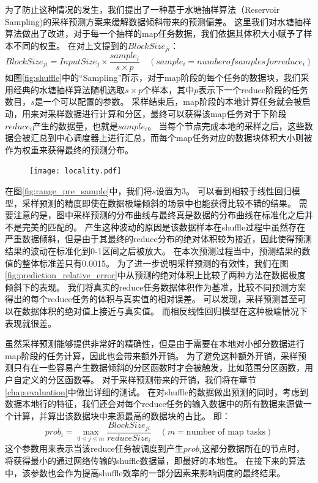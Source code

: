 为了防止这种情况的发生，我们提出了一种基于水塘抽样算法（Reservoir Sampling)\cite{reservoir}的采样预测方案来缓解数据倾斜带来的预测偏差。
这里我们对水塘抽样算法做出了改进，对于每一个抽样的map任务数据，我们依据其体积大小赋予了样本不同的权重。
在对上文提到的$BlockSize_{ji}$：
\begin{equation}
	\label{eq:sample}
	BlockSize_{ji} = {{InputSize_j \times \frac{sample_i}{s \times p}}} \quad (sample_i = number of samples for reduce_i)
\end{equation}
如图\ref{fig:shuffle}中的“Sampling”所示，对于map阶段的每个任务的数据块，我们采用经典的水塘抽样算法随机选取$s \times p$个样本，其中$p$表示下一个reduce阶段的任务数目，$s$是一个可以配置的参数。
采样结束后，map阶段的本地计算任务就会被启动，用来对采样数据进行计算和分区，最终可以获得该map任务对于下阶段$reduce_i$产生的数据量，也就是$sample_i$。
当每个节点完成本地的采样之后，这些数据会被汇总到中心调度器上进行汇总，而每个map任务对应的数据块体积大小则被作为权重来获得最终的预测分布。

\begin{figure}[!htp]
    \centering
    \texttt{[image: locality.pdf]}
\end{figure}

在图\ref{fig:range_pre_sample}中，我们将$s$设置为3。
可以看到相较于线性回归模型，采样预测的精度即使在数据极端倾斜的场景中也能获得比较不错的结果。
需要注意的是，图中采样预测的分布曲线与最终真是数据的分布曲线在标准化之后并不是完美的匹配的。
产生这种波动的原因是该数据样本在shuffle过程中虽然存在严重数据倾斜，但是由于其最终的reduce分布的绝对体积较为接近，因此使得预测结果的波动在标准化到0-1区间之后被放大。
在本次预测过程当中，预测结果的数值的整体标准差只有0.0015。
为了进一步说明采样预测的有效性，我们在图\ref{fig:prediction_relative_error}中从预测的绝对体积上比较了两种方法在数据极度倾斜下的表现。
我们将真实的reduce任务数据体积作为基准，比较不同预测方案得出的每个reduce任务的体积与真实值的相对误差。
可以发现，采样预测甚至可以在数据体积的绝对值上接近与真实值。
而相反线性回归模型在这种极端情况下表现就很差。

虽然采样预测能够提供非常好的精确性，但是由于需要在本地对小部分数据进行map阶段的任务计算，因此也会带来额外开销。
为了避免这种额外开销，采样预测只有在一些容易产生数据倾斜的分区函数时才会被触发，比如范围分区函数，用户自定义的分区函数等。
对于采样预测带来的开销，我们将在章节\ref{chap:evaluation}中做出详细的测试。
在对shuffle的数据做出预测的同时，考虑到数据本地行的特征，我们还会对每个reduce任务的输入数据中的所有数据来源做一个计算，并算出该数据块中来源最高的数据块的占比。
即：
\begin{equation}
	\label{eq:prob}
	prob_i = \max_{0 \leq j \leq m} \frac{BlockSize_{ji}}{reduceSize_i} \quad (m = \text{number of map tasks})
\end{equation}
这个参数用来表示当该reduce任务被调度到产生$prob_i$这部分数据所在的节点时，将获得最小的通过网络传输的shuffle数据量，即最好的本地性。
在接下来的算法中，该参数也会作为提高shuffle效率的一部分因素来影响调度的最终结果。

